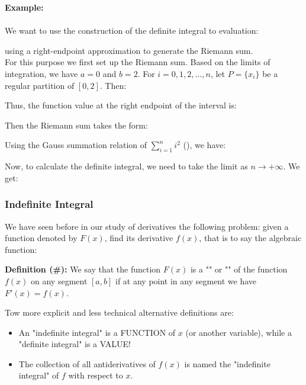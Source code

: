 	\begin{tcolorbox}[colframe=black,colback=white,sharp corners]
	\textbf{{\Large {}}Example:}\\\\
	We want to use the construction of the definite integral to evaluation:
	
	using a right-endpoint approximation to generate the Riemann sum.\\
	
	For this purpose we first set up the Riemann sum. Based on the limits of integration, we have $a=0$ and $b=2$. For $i=0,1,2,\ldots,n$, let $P=\{x_i\}$ be a regular partition of $[0,2]$. Then:
	
	Thus, the function value at the right endpoint of the interval is:
	
	Then the Riemann sum takes the form:
	
	Using the Gauss summation relation of $\displaystyle\sum_{i=1}^n i^2$ (), we have:
	
	Now, to calculate the definite integral, we need to take the limit as $n\rightarrow+\infty$. We get:
	 
	\end{tcolorbox}
	
	\subsubsection{Indefinite Integral}
	We have seen before in our study of derivatives the following problem: given a function denoted by $F(x)$, find its derivative $f(x)$, that is to say the algebraic function:
	
	\textbf{Definition (\#\mydef):} We say that the function $F (x)$ is a "" or "" of the function $f (x)$ on any segment $[a, b]$ if at any point in any segment we have $F'(x)=f(x)$.
	
	Tow more explicit and less technical alternative definitions are: 
	\begin{itemize}
		\item An "indefinite integral" is a FUNCTION of $x$ (or another variable), while a "definite integral" is a VALUE!
		
		\item The collection of all antiderivatives of $f(x)$ is named the "indefinite integral" of $f$ with respect to $x$.
	\end{itemize}

